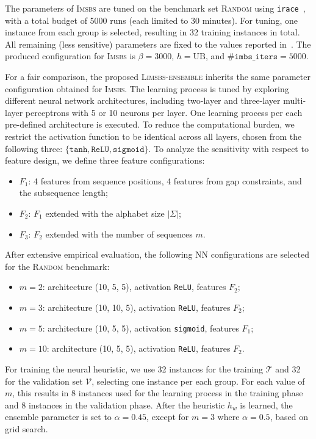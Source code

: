 \documentclass[runningheads]{llncs}
\begin{document}
The parameters of \textsc{Imsbs} are tuned on the benchmark set \textsc{Random} using \texttt{irace}~\cite{perez2014analysis}, with a total budget of 5000 runs (each limited to 30 minutes). For tuning, one instance from each group is selected, resulting in 32 training instances in total. All remaining (less sensitive) parameters are fixed to the values reported  in~\cite{djukanovic2026_eurocast}. The produced configuration for \textsc{Imsbs} is $\beta=3000$, $h=\text{UB}$, and $\#\texttt{imbs\_iters}=5000$.
 
For a fair comparison, the proposed \textsc{Limsbs-ensemble} inherits the same parameter configuration obtained for \textsc{Imsbs}. The learning process is tuned by exploring different neural network architectures, including two-layer and three-layer multi-layer perceptrons with 5 or 10 neurons per layer. One learning process per each pre-defined architecture is executed. To reduce the computational burden, we restrict the activation function to be identical across all layers, chosen from the following three: $\{\texttt{tanh}, \texttt{ReLU}, \texttt{sigmoid}\}$. To analyze the sensitivity with respect to feature design, we define three feature configurations:
\begin{itemize}
	\item $F_1$: 4 features from sequence positions, 4 features from gap constraints, and the subsequence length;
	\item $F_2$: $F_1$ extended with the alphabet size $|\Sigma|$;
	\item $F_3$: $F_2$ extended with the number of sequences $m$.
\end{itemize}

After extensive empirical evaluation, the following NN configurations are selected for the \textsc{Random} benchmark:
\begin{itemize}
	\item $m=2$: architecture (10, 5, 5), activation \texttt{ReLU}, features $F_2$;
	\item $m=3$: architecture (10, 10, 5), activation \texttt{ReLU}, features $F_2$;
	\item $m=5$: architecture (10, 5, 5), activation \texttt{sigmoid}, features $F_1$;
	\item $m=10$: architecture (10, 5, 5), activation \texttt{ReLU}, features $F_2$.
\end{itemize}

For training the neural heuristic, we use 32 instances for the training $\mathcal{T}$ and 32 for the validation set $\mathcal{V}$, selecting one instance per each group. For each value of $m$, this results in 8 instances used for the learning process in the training phase and 8 instances in the validation phase.   After the heuristic $h_w$ is learned, the ensemble parameter is set to $\alpha = 0.45$, except for $m=3$ where $\alpha=0.5$, based on grid search.
\end{document}
